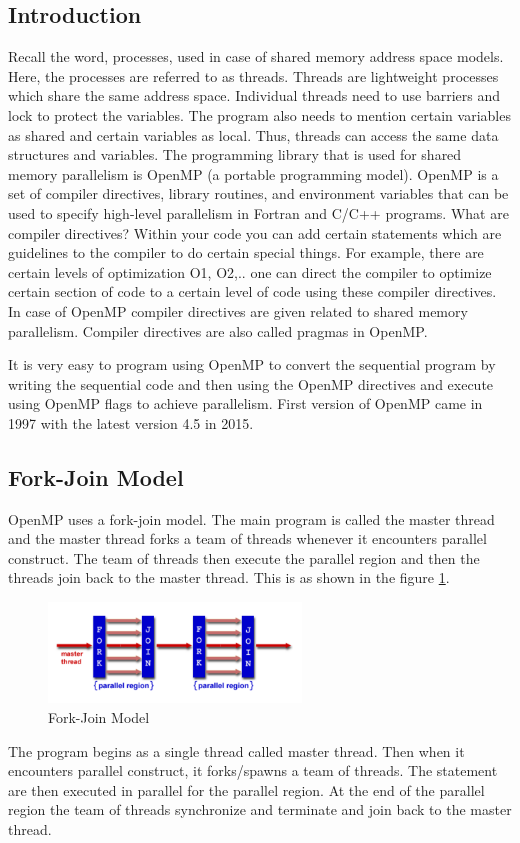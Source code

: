 \documentclass[12pt]{article}
\begin{document}
\subsection{Introduction}
Recall the word, processes, used in case of shared memory address space models. Here, the processes are referred to as threads.
Threads are lightweight processes which share the same address space. Individual threads need to use barriers and lock to protect the variables. 
The program also needs to mention certain variables as shared and certain variables as local. 
Thus, threads can access the same data structures and variables. The programming library that is used for shared memory parallelism is OpenMP (a portable programming model).
OpenMP is a set of compiler directives, library routines, and environment variables that can be used to specify high-level parallelism in Fortran and C/C++ programs.
What are compiler directives? Within your code you can add certain statements which are guidelines to the compiler to do certain special things.
For example, there are certain levels of optimization O1, O2,.. one can direct the compiler to optimize certain section of code to a certain level of code using these compiler directives.
In case of OpenMP compiler directives are given related to shared memory parallelism. Compiler directives are also called pragmas in OpenMP.

It is very easy to program using OpenMP to convert the sequential program by writing the sequential code and then using the OpenMP directives and execute using OpenMP flags to achieve parallelism.
First version of OpenMP came in 1997 with the latest version 4.5 in 2015.

\subsection{Fork-Join Model}
OpenMP uses a fork-join model. The main program is called the master thread and the master thread forks a team of threads whenever it encounters parallel construct. The team of threads then execute the parallel region and 
then the threads join back to the master thread.
This is as shown in the figure \ref{fig:forkjoin}.
\begin{figure}[H]
    \centering
    \includegraphics[width=0.6\textwidth]{images/forkjoin.png}
    \caption{Fork-Join Model}
    \label{fig:forkjoin}
\end{figure}
The program begins as a single thread called master thread. Then when it encounters parallel construct, it forks/spawns
a team of threads. The statement are then executed in parallel for the parallel region. At the end of the parallel region the team of threads synchronize and terminate and join
back to the master thread.
\end{document}
